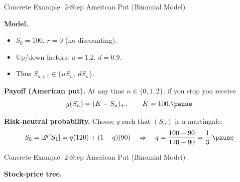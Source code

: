 \documentclass[aspectratio=169]{beamer}
\begin{document}
\begin{frame}{Concrete Example: 2-Step American Put (Binomial Model)}

\textbf{Model.}
\begin{itemize}
  \item $S_0=100$, $r=0$ (no discounting).\pause
  \item Up/down factors: $u=1.2$, $d=0.9$.\pause
  \item Thus $S_{n+1}\in\{uS_n,\ dS_n\}$.\pause
\end{itemize}

\medskip

\textbf{Payoff (American put).}
At any time $n\in\{0,1,2\}$, if you stop you receive
\[
g(S_n)=(K-S_n)_+,\qquad K=100.\pause
\]

\medskip

\textbf{Risk-neutral probability.}
Choose $q$ such that $(S_n)$ is a martingale:
\[
S_0=\mathbb{E}^q[S_1]=q(120)+(1-q)(90)
\quad\Rightarrow\quad
q=\frac{100-90}{120-90}=\frac{1}{3}.\pause
\]

\end{frame}

\begin{frame}{Concrete Example: 2-Step American Put (Binomial Model)}

\textbf{Stock-price tree.}
\begin{center}
\end{center}

\end{frame}
\end{document}
